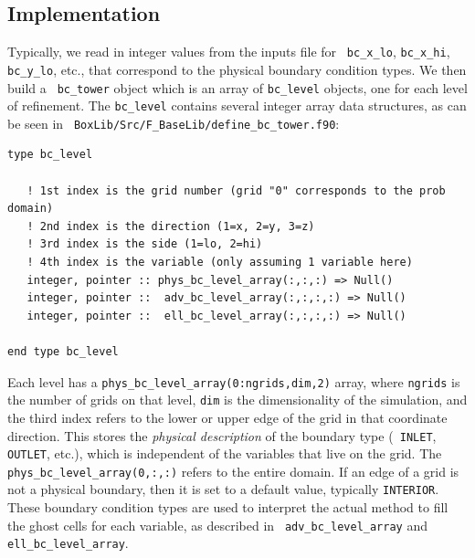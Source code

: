 \subsection{Implementation}
Typically, we read in integer values from the inputs file for {\tt
  bc\_x\_lo}, {\tt bc\_x\_hi}, {\tt bc\_y\_lo}, etc., that correspond
to the physical boundary condition types.  We then build a {\tt
  bc\_tower} object which is an array of {\tt bc\_level} objects, one
for each level of refinement.  The {\tt bc\_level} contains several
integer array data structures, as can be seen in {\tt
  BoxLib/Src/F\_BaseLib/define\_bc\_tower.f90}:
\begin{lstlisting}[backgroundcolor=\color{light-green}]
type bc_level

   ! 1st index is the grid number (grid "0" corresponds to the prob domain)
   ! 2nd index is the direction (1=x, 2=y, 3=z)
   ! 3rd index is the side (1=lo, 2=hi)
   ! 4th index is the variable (only assuming 1 variable here)
   integer, pointer :: phys_bc_level_array(:,:,:) => Null()
   integer, pointer ::  adv_bc_level_array(:,:,:,:) => Null()
   integer, pointer ::  ell_bc_level_array(:,:,:,:) => Null()

end type bc_level
\end{lstlisting}
Each level has a {\tt phys\_bc\_level\_array(0:ngrids,dim,2)} array,
where {\tt ngrids} is the number of grids on that level, {\tt dim} is
the dimensionality of the simulation, and the third index refers to
the lower or upper edge of the grid in that coordinate direction.
This stores the {\it physical description} of the boundary type ({\tt
  INLET}, {\tt OUTLET}, etc.), which is independent of the variables
that live on the grid.  The {\tt phys\_bc\_level\_array(0,:,:)} refers
to the entire domain.  If an edge of a grid is not a physical
boundary, then it is set to a default value, typically {\tt INTERIOR}.
These boundary condition types are used to interpret the actual method
to fill the ghost cells for each variable, as described in {\tt
  adv\_bc\_level\_array} and {\tt ell\_bc\_level\_array}.

